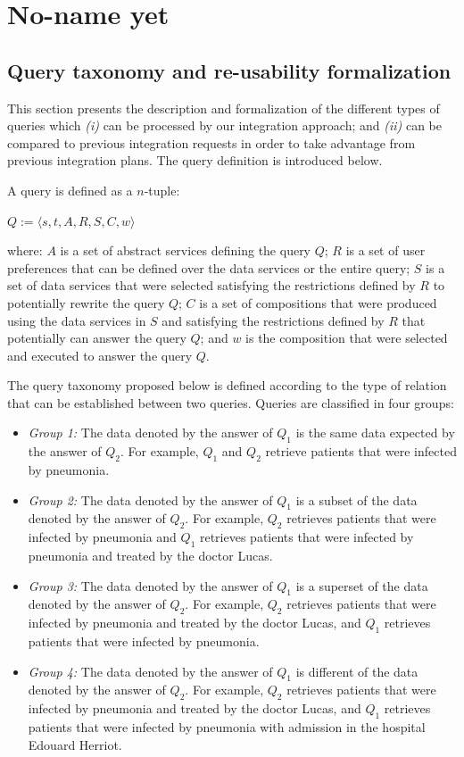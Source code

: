 \chapter{No-name yet}

\newpage

\section{Query taxonomy and re-usability formalization}

This section presents the description and formalization of the different types of queries which \textit{(i)} can be processed by our integration approach; and \textit{(ii)} can be compared to previous integration requests in order to take advantage from previous integration plans. The query definition is introduced below.

\begin{definition}
A query is defined as a $n$-tuple:
%
\begin{center}
$Q := \langle s, t, A, R, S, C, w  \rangle$
\end{center}
%
where: $A$ is a set of abstract services defining the query $Q$;
$R$ is a set of user preferences that can be defined over the data services or the entire query;
$S$ is a set of data services that were selected satisfying the restrictions defined by $R$ to potentially rewrite the query $Q$;
$C$ is a set of compositions that were produced using the data services in $S$ and satisfying the restrictions defined by $R$ that potentially can answer the query $Q$; and
$w$ is the composition that were selected and executed to answer the query $Q$. 
\end{definition}

The query taxonomy proposed below is defined according to the type of relation that can be established between two queries. 
Queries are classified in four groups: 
\begin{itemize}
\item \textit{Group 1:} The data denoted by the answer of $Q_{1}$ is the same data expected by the answer of $Q_{2}$. For example, $Q_{1}$ and $Q_{2}$ retrieve patients that were infected by pneumonia.
\item \textit{Group 2:} The data denoted by the answer of $Q_{1}$ is a subset of the data denoted by the answer of $Q_{2}$. For example, $Q_{2}$ retrieves patients that were infected by pneumonia and $Q_{1}$ retrieves patients that were infected by pneumonia and treated by the doctor Lucas.
\item \textit{Group 3:} The data denoted by the answer of $Q_{1}$ is a superset of the data denoted by the answer of $Q_{2}$. For example, $Q_{2}$ retrieves patients that were infected by pneumonia and treated by the doctor Lucas, and $Q_{1}$ retrieves patients that were infected by pneumonia.
\item \textit{Group 4:} The data denoted by the answer of $Q_{1}$ is different of the data denoted by the answer of $Q_{2}$. For example, $Q_{2}$ retrieves patients that were infected by pneumonia and treated by the doctor Lucas, and $Q_{1}$ retrieves patients that were infected by pneumonia with admission in the hospital Edouard Herriot.
\end{itemize}

